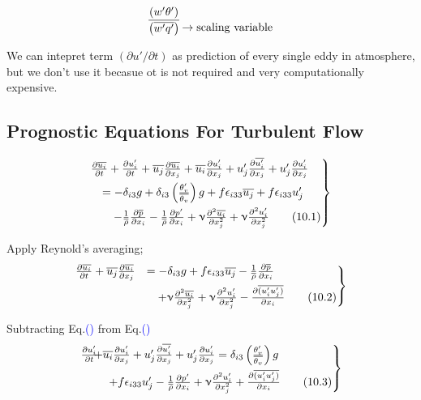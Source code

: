 \documentclass[fleqn,10pt]{SelfArx} %
\newcommand{\myeqref}[1]{Eq.\textcolor{blue}{\textup{(\getrefnumber{#1})}}}
\newcommand*{\bfrac}[2]{\genfrac{}{}{0pt}{}{#1}{#2}}
\begin{document}
\begin{align*}
	\frac{\left(w'\theta'\right)}{\left(\overline{w'q'}\right)} \bfrac{}{\rightarrow \text{scaling variable}}
\end{align*}

We can intepret term \( ( \partial u' / \partial t )\) as prediction of every single eddy in atmosphere, but we don't use it becasue ot is not required and very computationally expensive.

\subsection{Prognostic Equations For Turbulent Flow}
\begin{align*}
	\begin{rcases}
		&\mspace{-20mu} \frac{\partial \overline{u_i}}{\partial t} + \frac{\partial u_i'}{\partial t} + \overline{u_j}\frac{\partial \overline{u_i}}{\partial x_j} + \overline{u_i}\frac{\partial u_i'}{\partial x_j} + u_j'\frac{\partial \overline{u_i'}}{\partial x_j} + u_j'\frac{\partial u_i'}{\partial x_j} \\ &\mspace{-20mu} \quad = -\delta_{i3}g + \delta_{i3}\left(\frac{\theta_v'}{\overline{\theta_v}}\right)g + f\epsilon_{i33}\overline{u_j} + f\epsilon_{i33}u_j' \\ &\mspace{-20mu} \quad \quad - \frac{1}{\overline{\rho}}\frac{\partial \overline{p}}{\partial x_i} - \frac{1}{\overline{\rho}}\frac{\partial p'}{\partial x_i} + \upnu\frac{\partial^2 \overline{u_i}}{\partial x_j^2} + \upnu\frac{\partial^2 u_i'}{\partial x_j^2} \tag{10.1} \label{eq:10.1}
	\end{rcases}
\end{align*}

Apply Reynold's averaging;
\begin{align*}
	\begin{rcases}
		\frac{\partial \overline{u_i}}{\partial t} + \overline{u_j}\frac{\partial \overline{u_i}}{\partial x_j} &= -\delta_{i3}g + f\epsilon_{i33}\overline{u_j} - \frac{1}{\overline{\rho}}\frac{\partial \overline{p}}{\partial x_i} \\ &\quad + \upnu\frac{\partial^2 \overline{u_i}}{\partial x_j^2} + \upnu\frac{\partial^2 u_i'}{\partial x_j^2} - \frac{\partial \overline{(u_i'u_j')}}{\partial x_i} \tag{10.2} \label{eq:10.2}
	\end{rcases}
\end{align*}

Subtracting \myeqref{eq:10.2} from \myeqref{eq:10.1} 
\begin{align*}
	\begin{rcases}
		\frac{\partial u_i'}{\partial t} & \!\!\!\!\!\!\!\! + \overline{u_i}\frac{\partial u_i'}{\partial x_j} + u_j'\frac{\partial \overline{u_i'}}{\partial x_j} + u_j'\frac{\partial u_i'}{\partial x_j} = \delta_{i3}\left(\frac{\theta_v'}{\overline{\theta_v}}\right)g  \\ &+ f\epsilon_{i33}u_j' - \frac{1}{\overline{\rho}}\frac{\partial p'}{\partial x_i} + \upnu\frac{\partial^2 u_i'}{\partial x_j^2} + \frac{\partial \overline{(u_i'u_j')}}{\partial x_i} \tag{10.3} \label{eq:10.3}
	\end{rcases}
\end{align*}
\end{document}
